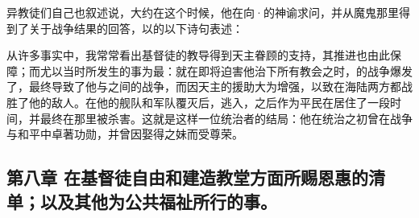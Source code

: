 异教徒们自己也叙述说，大约在这个时候，他在向·的神谕求问，并从魔鬼那里得到了关于战争结果的回答，以的以下诗句表述：\par

\par

从许多事实中，我常常看出基督徒的教导得到天主眷顾的支持，其推进也由此保障；而尤以当时所发生的事为最：就在即将迫害他治下所有教会之时，的战争爆发了，最终导致了他与之间的战争，而因天主的援助大为增强，以致在海陆两方都战胜了他的敌人。在他的舰队和军队覆灭后，逃入，之后作为平民在居住了一段时间，并最终在那里被杀害。这就是这样一位统治者的结局：他在统治之初曾在战争与和平中卓著功勋，并曾因娶得之妹而受尊荣。\par


\subsection{第八章 在基督徒自由和建造教堂方面所赐恩惠的清单；以及其他为公共福祉所行的事。}

